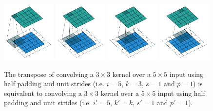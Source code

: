 \documentclass{report}
\begin{document}
\begin{figure}[p]
    \centering
    \includegraphics[width=0.24\textwidth]{pdf/same_padding_no_strides_transposed_00.pdf}
    \includegraphics[width=0.24\textwidth]{pdf/same_padding_no_strides_transposed_01.pdf}
    \includegraphics[width=0.24\textwidth]{pdf/same_padding_no_strides_transposed_02.pdf}
    \includegraphics[width=0.24\textwidth]{pdf/same_padding_no_strides_transposed_03.pdf}
    \caption{\label{fig:same_padding_no_strides_transposed} The transpose
        of convolving a $3 \times 3$ kernel over a $5 \times 5$ input using half
        padding and unit strides (i.e. $i = 5$, $k = 3$, $s = 1$ and $p = 1$) is
        equivalent to convolving a $3 \times 3$ kernel over a $5 \times 5$ input
        using half padding and unit strides (i.e. $i' = 5$, $k' = k$, $s' = 1$
        and $p' = 1$).}
\end{figure}
\end{document}
